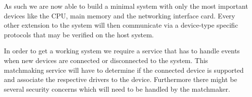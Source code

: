 As such we are now able to build a minimal system with only the most important devices like the CPU, main memory and the networking interface card.
Every other extension to the system will then communicate via a device-type specific protocols that may be verified on the host system.

In order to get a working system we require a service that has to handle events when new devices are connected or disconnected to the system.
This matchmaking service will have to determine if the connected device is supported and associate the respective drivers to the device.
Furthermore there might be several security concerns which will need to be handled by the matchmaker.

